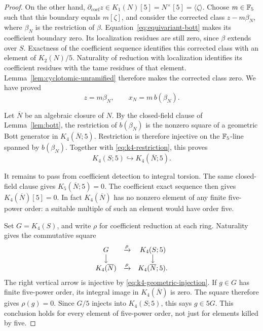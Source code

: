 \begin{proof}
On the other hand,
$\partial_{\mathrm{coef}}z\in K_1(N)[5]=N^\times[5]=\langle\zeta\rangle$.
Choose $m\in\mathbb F_5$ such that this boundary equals $m[\zeta]$, and consider
the corrected class $z-m\beta_N$, where $\beta_N$ is the restriction of
$\beta$.  Equation~\eqref{eq:equivariant-bott} makes its coefficient
boundary zero.  Its localization residues are still zero, since $\beta$ extends
over $S$.  Exactness of the coefficient sequence identifies this
corrected class with an element of $K_2(N)/5$.  Naturality of reduction
with localization identifies its coefficient residues with the tame
residues of that element.  Lemma~\ref{lem:cyclotomic-unramified} therefore makes
the corrected class zero.  We have proved
\[
 z=m\beta_N,\qquad x_N=m\,b(\beta_N).
\]

Let $\overline N$ be an algebraic closure of $N$.  By the closed-field
clause of Lemma~\ref{lem:bott}, the restriction of $b(\beta_N)$ is
the nonzero square of a geometric Bott generator in
$K_4(\overline N;5)$.  Restriction is therefore injective on the
$\mathbb F_5$-line spanned by $b(\beta_N)$.  Together with
\eqref{eq:k4-restriction}, this proves
\begin{equation}
 \label{eq:k4-geometric-injection}
 K_4(S;5)\hookrightarrow K_4(\overline N;5).
\end{equation}

It remains to pass from coefficient detection to integral torsion.
The same closed-field clause gives $K_5(\overline N;5)=0$.  The
coefficient exact sequence then gives $K_4(\overline N)[5]=0$.
In fact $K_4(\overline N)$ has no nonzero element of any finite
five-power order: a suitable multiple of such an element would have
order five.

Set $G=K_4(S)$, and write $\rho$ for coefficient reduction at each
ring.  Naturality gives the commutative square
\[
 \begin{array}{ccc}
 G &\xrightarrow{\rho}& K_4(S;5)\\
 \big\downarrow && \big\downarrow\\
 K_4(\overline N)&\xrightarrow{\rho}&K_4(\overline N;5).
 \end{array}
\]
The right vertical arrow is injective by
\eqref{eq:k4-geometric-injection}.  If $g\in G$ has finite five-power
order, its integral image in $K_4(\overline N)$ is zero.  The square
therefore gives $\rho(g)=0$.  Since $G/5$ injects into
$K_4(S;5)$, this says $g\in5G$.  This conclusion holds for every
element of five-power order, not just for elements killed by five.


\end{proof}

